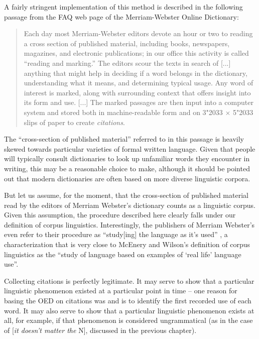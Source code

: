 A fairly stringent implementation of this method is described in the following passage from the FAQ web page of the Merriam\hyp{}Webster Online  Dictionary:\largerpage

\begin{quotation}
Each day most Merriam\hyp{}Webster editors devote an hour or two to reading a cross section of published material, including books, newspapers,  magazines, and electronic publications; in our office this activity is called ``reading and marking.'' The editors scour the texts in search of [...] anything that might help in deciding if a word belongs in the dictionary,  understanding what it means, and determining typical usage. Any word of interest is marked,  along with surrounding context that offers insight into its form and use. [...] The marked  passages are then input into a computer system and stored both in machine\hyp{}readable form and on 3\char"2033 $\times$ 5\char"2033 slips of paper to create \emph{citations}. \citep{merriam-webster_how_2014}
\end{quotation}

The ``cross\hyp{}section of published material'' referred to in this passage is heavily skewed towards particular varieties  of formal written  language. Given that people will typically consult dictionaries  to look up unfamiliar words they encounter in writing, this may be a reasonable choice to make, although it should be pointed out that modern dictionaries are often based on more diverse linguistic corpora.

But let us assume, for the moment, that the cross\hyp{}section of published material read by the editors of Merriam Webster's dictionary  counts as a linguistic corpus. Given this assumption, the procedure described here clearly falls under our definition of corpus linguistics. Interestingly, the publishers of Merriam Webster's even refer to their procedure as ``study[ing] the language as it's used'' \citep{merriam-webster_how_2014}, a characterization that is very close to McEnery and Wilson's definition of corpus linguistics as the ``study of language based on examples of `real life' language use''.

Collecting citations is perfectly legitimate. It may serve to show that a particular linguistic phenomenon existed at a particular point in time -- one reason for basing the OED  on citations was and is to identify the first recorded use of each word. It may also serve to show that a particular linguistic phenomenon exists at all, for example, if that phenomenon is considered ungrammatical  (as in the case of [\textit{it doesn't matter the} N], discussed in the previous chapter).

